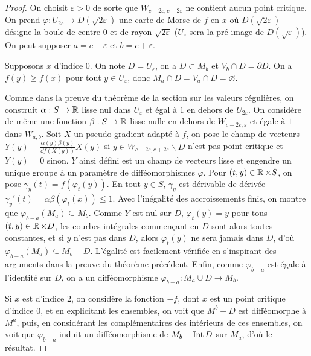 \begin{proof}
    On choisit $\varepsilon > 0$ de sorte que $W_{c-2\varepsilon,c+2\varepsilon}$ ne contient 
    aucun point critique.
    On prend $\varphi:U_{2\varepsilon}\to D(\sqrt{2\varepsilon})$ une carte de Morse de $f$ 
    en $x$ où $D(\sqrt{2\varepsilon})$ désigne la boule de centre $0$ et de rayon 
    $\sqrt{2\varepsilon}$ ($U_\varepsilon$ sera la pré-image de $D(\sqrt\varepsilon)$).
    On peut supposer $a=c-\varepsilon$ et $b=c+\varepsilon$.

    Supposons $x$ d'indice $0$. 
    On note $D=U_\varepsilon$, on a $D\subset M_b$ et $V_b\cap D=\partial D$.
    On a $f(y)\geq f(x)$ pour tout $y\in U_\varepsilon$, donc $M_a\cap D=V_a\cap D=\varnothing$.

    Comme dans la preuve du théorème de la section sur les valeurs régulières, on construit 
    $\alpha:S\to \operatorname{\mathbb R}$ lisse nul dans $U_\varepsilon$ et égal à $1$ en dehors de $U_{2\varepsilon}$.
    On considère de même une fonction $\beta:S\to\operatorname{\mathbb R}$ lisse nulle en dehors de 
    $W_{c-2\varepsilon,\varepsilon}$ et égale à $1$ dans $W_{a,b}$. 
    Soit $X$ un pseudo-gradient adapté à $f$, on pose le champ de vecteurs 
    $Y(y)=\frac{\alpha(y)\beta(y)}{\dd f(X(y))}X(y)$ si 
    $y\in W_{c-2\varepsilon,c+2\varepsilon}\backslash D$ n'est pas point critique et $Y(y)=0$ sinon.
    $Y$ ainsi défini est un champ de vecteurs lisse et engendre un unique groupe à un paramètre 
    de difféomorphismes $\varphi$. 
    Pour $(t,y)\in\operatorname{\mathbb R}\times S$, on pose $\gamma_y(t)=f(\varphi_t(y))$. En tout $y\in S$, $\gamma_y$ 
    est dérivable de dérivée $\gamma_y'(t)=\alpha\beta(\varphi_t(x))\leq 1$.
    Avec l'inégalité des accroissements finis, on montre que $\varphi_{b-a}(M_a)\subseteq M_b$. 
    Comme $Y$ est nul sur $D$, $\varphi_t(y)=y$ pour tous $(t,y)\in\operatorname{\mathbb R}\times D$, les courbes 
    intégrales commençant en $D$ sont alors toutes constantes, et si $y$ n'est pas dans $D$,
    alors $\varphi_t(y)$ ne sera jamais dans $D$, d'où $\varphi_{b-a}(M_a)\subseteq M_b-D$. 
    L'égalité est facilement vérifiée en s'inspirant des arguments dans la preuve du théorème 
    précédent.
    Enfin, comme $\varphi_{b-a}$ est égale à l'identité sur $D$, on a un difféomorphisme 
    $\varphi_{b-a}:M_a\cup D\to M_b$.
    
    Si $x$ est d'indice $2$, on considère la fonction $-f$, dont $x$ est un point critique 
    d'indice $0$, et en explicitant les ensembles, on voit que $M^b-D$ est difféomorphe à $M^a$, 
    puis, en considérant les complémentaires des intérieurs de ces ensembles, on voit que 
    $\varphi_{b-a}$ induit un difféomorphisme de $M_b-\operatorname{Int} D$ sur $M_a$, d'où le résultat.
\end{proof}

